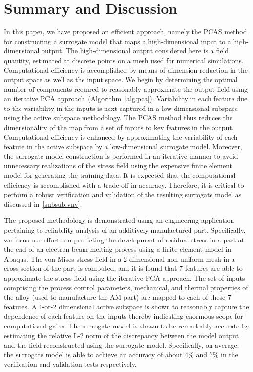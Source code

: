 \section{Summary and Discussion}
\label{sec:conc}

In this paper, we have proposed an efficient approach, namely the PCAS method for constructing a surrogate model that 
maps a high-dimensional input to a high-dimensional output. The high-dimensional output considered here is a field quantity,
estimated at discrete points on a mesh used for numerical simulations. Computational efficiency is
accomplished by means of dimension reduction in the output space as well as the input space.
We begin by determining the optimal number of
components required to reasonably approximate the output field using an iterative PCA approach~(Algorithm~\ref{alg:pca}).
Variability in each feature due to the variability
in the inputs is next captured in a low-dimensional subspace using the active subspace methodology.
The PCAS method thus reduces the dimensionality
of the map from a set of inputs to key features in the output. Computational efficiency is enhanced by 
approximating the variability of each feature in the active subspace by a low-dimensional surrogate model.
Moreover, the surrogate model construction is performed in an iterative manner to avoid unnecessary realizations 
of the stress field using the expensive finite element model for generating the training data. 
It is expected that the computational efficiency is accomplished with a trade-off in accuracy.
Therefore, it is critical to perform a robust verification and validation of the resulting surrogate model as discussed
in~\ref{subsub:vnv}. 

The proposed methodology is demonstrated using an engineering application pertaining to reliability analysis of
an additively manufactured part. Specifically, we focus our efforts on predicting the development of residual
stress in a part at the end of an electron beam melting process using a finite element model in Abaqus.
The von Mises stress field in a 2-dimensional non-uniform mesh
in a cross-section of the part is computed, and it is found that
7 features are able to approximate the stress field using the iterative PCA approach. The set of inputs
comprising the process control parameters, mechanical, and thermal properties of the alloy (used to manufacture the
AM part) are mapped to each of these 7 features. A 1-or-2 dimensional active subspace is shown to reasonably
capture the dependence of each feature on the inputs thereby indicating enormous scope for computational gains.
The surrogate model is shown to be remarkably accurate by estimating the relative L-2 norm of the discrepancy
between the model output and the field reconstructed using the surrogate model. Specifically, on average, the
surrogate model is able to achieve an accuracy of about 4$\%$ and 7$\%$ in the verification and validation tests respectively.

